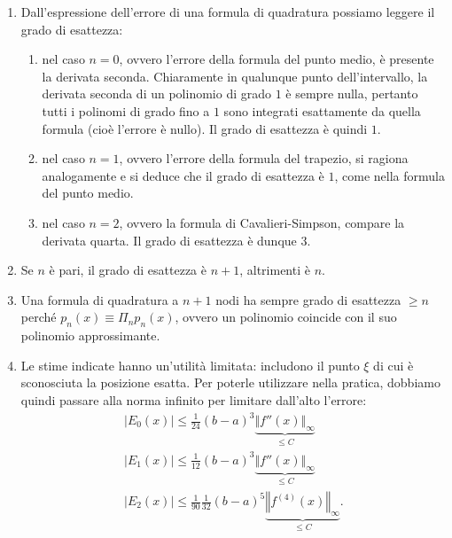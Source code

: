 \begin{enumerate}
\item Dall'espressione dell'errore di una formula di quadratura possiamo leggere il grado di esattezza:
\begin{enumerate}
\item nel caso $n=0$, ovvero l'errore della formula del punto medio, è presente la derivata seconda. Chiaramente in qualunque punto dell'intervallo, la derivata seconda di un polinomio di grado $1$ è sempre nulla, pertanto tutti i polinomi di grado fino a $1$ sono integrati esattamente da quella formula (cioè l'errore è nullo). Il grado di esattezza è quindi $1$.
\item nel caso $n=1$, ovvero l'errore della formula del trapezio, si ragiona analogamente e si deduce che il grado di esattezza è $1$, come nella formula del punto medio.
\item nel caso $n=2$, ovvero la formula di Cavalieri-Simpson, compare la derivata quarta. Il grado di esattezza è dunque $3$.
\end{enumerate}
\item Se $n$ è pari, il grado di esattezza è $n+1$, altrimenti è $n$.
\item Una formula di quadratura a $n+1$ nodi ha sempre grado di esattezza $\geqslant n$ perché $p_{n}(x) \equiv \Pi _{n} p_{n}(x)$, ovvero un polinomio coincide con il suo polinomio approssimante.
\item Le stime indicate hanno un'utilità limitata: includono il punto $\xi$ di cui è sconosciuta la posizione esatta. Per poterle utilizzare nella pratica, dobbiamo quindi passare alla norma infinito per limitare dall'alto l'errore:
\begin{equation*}
\begin{array}{ l }
| E_{0}(x)| \leqslant \frac{1}{24}( b-a)^{3}\underbrace{\Vert f''(x)\Vert _{\infty }}_{\leqslant C}\\
| E_{1}(x)| \leqslant \frac{1}{12}( b-a)^{3}\underbrace{\Vert f''(x)\Vert _{\infty }}_{\leqslant C}\\
| E_{2}(x)| \leqslant \frac{1}{90}\frac{1}{32}( b-a)^{5}\underbrace{\left\Vert f^{(4)}(x)\right\Vert _{\infty }}_{\leqslant C}.
\end{array}
\end{equation*}
\end{enumerate}

